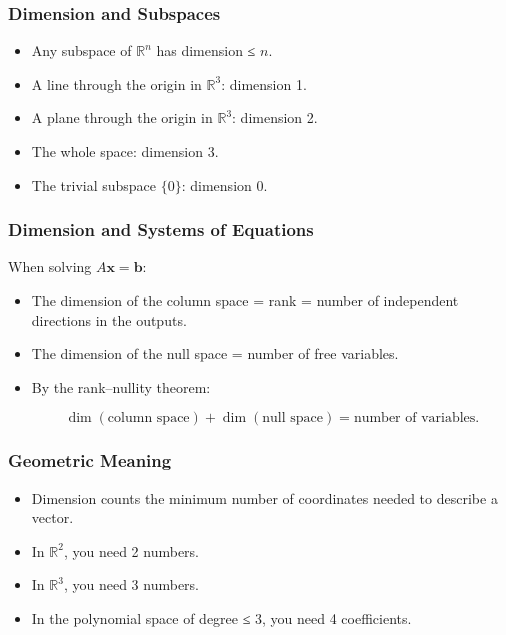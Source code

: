 \documentclass[
  letterpaper,
  DIV=11,
  numbers=noendperiod]{scrreprt}
\providecommand{\tightlist}{%
  \setlength{\itemsep}{0pt}\setlength{\parskip}{0pt}}
\begin{document}
\subsubsection{Dimension and Subspaces}\label{dimension-and-subspaces}

\begin{itemize}
\tightlist
\item
  Any subspace of \(\mathbb{R}^n\) has dimension ≤ \(n\).
\item
  A line through the origin in \(\mathbb{R}^3\): dimension 1.
\item
  A plane through the origin in \(\mathbb{R}^3\): dimension 2.
\item
  The whole space: dimension 3.
\item
  The trivial subspace \(\{0\}\): dimension 0.
\end{itemize}

\subsubsection{Dimension and Systems of
Equations}\label{dimension-and-systems-of-equations}

When solving \(A\mathbf{x} = \mathbf{b}\):

\begin{itemize}
\item
  The dimension of the column space = rank = number of independent
  directions in the outputs.
\item
  The dimension of the null space = number of free variables.
\item
  By the rank--nullity theorem:

  \[
  \dim(\text{column space}) + \dim(\text{null space}) = \text{number of variables}.
  \]
\end{itemize}

\subsubsection{Geometric Meaning}\label{geometric-meaning-4}

\begin{itemize}
\tightlist
\item
  Dimension counts the minimum number of coordinates needed to describe
  a vector.
\item
  In \(\mathbb{R}^2\), you need 2 numbers.
\item
  In \(\mathbb{R}^3\), you need 3 numbers.
\item
  In the polynomial space of degree ≤ 3, you need 4 coefficients.
\end{itemize}
\end{document}

